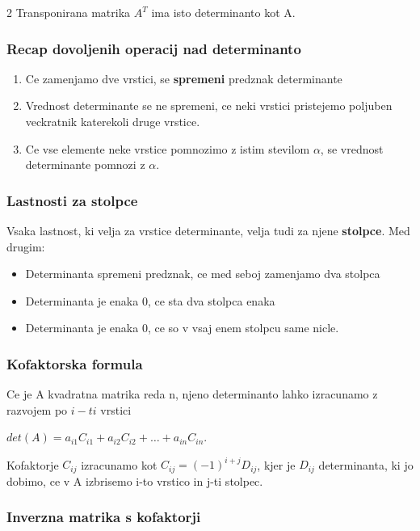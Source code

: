 \documentclass{article}
\begin{document}
\begin{multicols}{2}
	Transponirana matrika $A^{T}$ ima isto determinanto kot A.

	\subsubsection{Recap dovoljenih operacij nad determinanto}

	\begin{enumerate}
		\item Ce zamenjamo dve vrstici, se \textbf{spremeni} predznak determinante
		\item Vrednost determinante se ne spremeni, ce neki vrstici pristejemo poljuben veckratnik katerekoli druge vrstice.
		\item Ce vse elemente neke vrstice pomnozimo z istim stevilom $\alpha$, se vrednost determinante pomnozi z $\alpha$.
	\end{enumerate}

	\subsubsection{Lastnosti za stolpce}

	Vsaka lastnost, ki velja za vrstice determinante, velja tudi
	za njene \textbf{stolpce}. Med drugim:
	\begin{itemize}
		\item Determinanta spremeni predznak, ce med seboj zamenjamo dva stolpca
		\item Determinanta je enaka 0, ce sta dva stolpca enaka
		\item Determinanta je enaka 0, ce so v vsaj enem stolpcu same nicle.
	\end{itemize}

	\subsubsection{Kofaktorska formula}

	Ce je A kvadratna matrika reda n,
	njeno determinanto lahko izracunamo z razvojem po $i-ti$ vrstici
	\begin{center}
		$det(A) = a_{i1}C_{i1} + a_{i2}C_{i2} + \hdots + a_{in}C_{in}$.
	\end{center}
	Kofaktorje $C_{ij}$ izracunamo kot $C_{ij} = (-1)^{i+j}D_{ij}$, kjer je $D_{ij}$ determinanta,
	ki jo dobimo, ce v A izbrisemo i-to vrstico in j-ti stolpec.

	\subsubsection{Inverzna matrika s kofaktorji}


\end{multicols}
\end{document}
